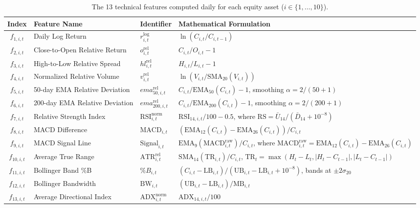 \begin{table}[htbp]
\centering
\small
\renewcommand{\arraystretch}{1.18}
\setlength{\tabcolsep}{4.5pt}
\caption{The 13 technical features computed daily for each equity asset ($i \in \{1,\dots,10\}$).}
\label{tab:features_summary}
\begin{tabularx}{\textwidth}{cllX}
\toprule
\textbf{Index} & \textbf{Feature Name} & \textbf{Identifier} & \textbf{Mathematical Formulation} \\
\midrule
$f_{1,i,t}$ & Daily Log Return & $r_{i,t}^{\text{log}}$ & $\ln(C_{i,t} / C_{i,t-1})$ \\
$f_{2,i,t}$ & Close-to-Open Relative Return & $o_{i,t}^{\text{rel}}$ & $C_{i,t} / O_{i,t} - 1$ \\
$f_{3,i,t}$ & High-to-Low Relative Spread & $hl_{i,t}^{\text{rel}}$ & $H_{i,t} / L_{i,t} - 1$ \\
$f_{4,i,t}$ & Normalized Relative Volume & $v_{i,t}^{\text{rel}}$ & $\ln(V_{i,t} / \text{SMA}_{20}(V_{i,t}))$ \\
$f_{5,i,t}$ & 50-day EMA Relative Deviation & $ema_{50,i,t}^{\text{rel}}$ & $C_{i,t} / \text{EMA}_{50}(C_{i,t}) - 1$, smoothing $\alpha = 2/(50+1)$ \citep{wang2025risk} \\
$f_{6,i,t}$ & 200-day EMA Relative Deviation & $ema_{200,i,t}^{\text{rel}}$ & $C_{i,t} / \text{EMA}_{200}(C_{i,t}) - 1$, smoothing $\alpha = 2/(200+1)$ \citep{wang2025risk} \\
$f_{7,i,t}$ & Relative Strength Index & $\text{RSI}_{i,t}^{\text{norm}}$ & $\text{RSI}_{14,i,t} / 100 - 0.5$, where $\text{RS} = \bar{U}_{14} / (\bar{D}_{14} + 10^{-8})$ \citep{wang2025risk} \\
$f_{8,i,t}$ & MACD Difference & $\text{MACD}_{i,t}$ & $(\text{EMA}_{12}(C_{i,t}) - \text{EMA}_{26}(C_{i,t})) / C_{i,t}$ \citep{wang2025risk} \\
$f_{9,i,t}$ & MACD Signal Line & $\text{Signal}_{i,t}$ & $\text{EMA}_9(\text{MACD}_{i,t}^{\text{raw}}) / C_{i,t}$, where $\text{MACD}_{i,t}^{\text{raw}} = \text{EMA}_{12}(C_{i,t}) - \text{EMA}_{26}(C_{i,t})$ \citep{wang2025risk} \\
$f_{10,i,t}$ & Average True Range & $\text{ATR}_{i,t}^{\text{rel}}$ & $\text{SMA}_{14}(\text{TR}_{i,t}) / C_{i,t}$, $\text{TR}_t = \max(H_t-L_t, |H_t-C_{t-1}|, |L_t-C_{t-1}|)$ \citep{wang2025risk} \\
$f_{11,i,t}$ & Bollinger Band \%B & $\%B_{i,t}$ & $(C_{i,t} - \text{LB}_{i,t}) / (\text{UB}_{i,t} - \text{LB}_{i,t} + 10^{-8})$, bands at $\pm 2\sigma_{20}$ \citep{wang2025risk} \\
$f_{12,i,t}$ & Bollinger Bandwidth & $\text{BW}_{i,t}$ & $(\text{UB}_{i,t} - \text{LB}_{i,t}) / \text{MB}_{i,t}$ \citep{wang2025risk} \\
$f_{13,i,t}$ & Average Directional Index & $\text{ADX}_{i,t}^{\text{norm}}$ & $\text{ADX}_{14,i,t} / 100$ \\
\bottomrule
\end{tabularx}
\end{table}

